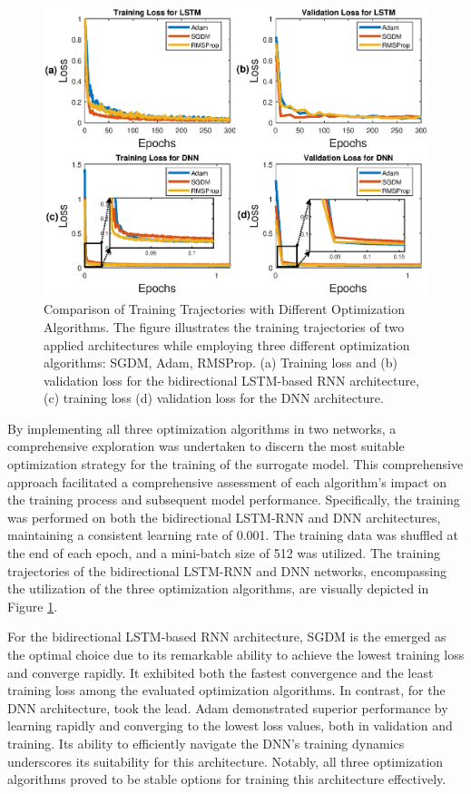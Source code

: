 \begin{figure}[htb]
    \centering
    \includegraphics[width=\linewidth]{img/chap4/comp_op.eps}
    \caption{Comparison of Training Trajectories with Different Optimization Algorithms. The figure illustrates the training trajectories of two applied architectures while employing three different optimization algorithms: \ac{SGDM}, \ac{Adam}, \ac{RMSProp}. (a) Training loss and (b) validation loss for the bidirectional \ac{LSTM}-based \ac{RNN} architecture, (c) training loss (d) validation loss for the \ac{DNN} architecture.}
    \label{fig:comp3op}
\end{figure}

By implementing all three optimization algorithms in two networks, a comprehensive exploration was undertaken to discern the most suitable optimization strategy for the training of the surrogate model. This comprehensive approach facilitated a comprehensive assessment of each algorithm's impact on the training process and subsequent model performance. Specifically, the training was performed on both the bidirectional LSTM-RNN and DNN architectures, maintaining a consistent learning rate of 0.001. The training data was shuffled at the end of each epoch, and a mini-batch size of 512 was utilized. The training trajectories of the bidirectional LSTM-RNN and DNN networks, encompassing the utilization of the three optimization algorithms, are visually depicted in Figure \ref{fig:comp3op}. 

For the bidirectional LSTM-based RNN architecture, SGDM is the emerged as the optimal choice due to its remarkable ability to achieve the lowest training loss and converge rapidly. It exhibited both the fastest convergence and the least training loss among the evaluated optimization algorithms. In contrast, for the DNN architecture, took the lead. Adam demonstrated superior performance by learning rapidly and converging to the lowest loss values, both in validation and training. Its ability to efficiently navigate the DNN's training dynamics underscores its suitability for this architecture. Notably, all three optimization algorithms proved to be stable options for training this architecture effectively.

